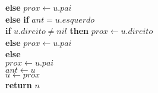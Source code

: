 \documentclass{beamer}
\begin{document}
\begin{frame}[shrink]
\begin{oframed}
\begin{flushleft}
\hspace*{1em} \hspace*{1em} \hspace*{1em} \hspace*{1em} {\color{black} \textbf{else}}  \ensuremath{\ensuremath{\mathit{prox}} \gets  \ensuremath{\ensuremath{\mathit{u}}.pai}}\\
\hspace*{1em} \hspace*{1em} \hspace*{1em} {\color{black} \textbf{else}} {\color{black} \textbf{if}} \ensuremath{\ensuremath{\mathit{ant}} = \ensuremath{\mathit{u}}.\ensuremath{\mathit{esquerdo}}}\\
\hspace*{1em} \hspace*{1em} \hspace*{1em} \hspace*{1em} {\color{black} \textbf{if}} \ensuremath{\ensuremath{\mathit{u}}.\ensuremath{\mathit{direito}} \ne nil} {\color{black} \textbf{then}}  \ensuremath{\ensuremath{\mathit{prox}} \gets  \ensuremath{\ensuremath{\mathit{u}}.direito}}\\
\hspace*{1em} \hspace*{1em} \hspace*{1em} \hspace*{1em} {\color{black} \textbf{else}}  \ensuremath{\ensuremath{\mathit{prox}} \gets  \ensuremath{\ensuremath{\mathit{u}}.pai}}\\
\hspace*{1em} \hspace*{1em} \hspace*{1em} {\color{black} \textbf{else}} \\
\hspace*{1em} \hspace*{1em} \hspace*{1em} \hspace*{1em} \ensuremath{\ensuremath{\mathit{prox}} \gets  \ensuremath{\ensuremath{\mathit{u}}.pai}}\\
\hspace*{1em} \hspace*{1em} \hspace*{1em} \ensuremath{\ensuremath{\mathit{ant}} \gets  \ensuremath{u}}\\
\hspace*{1em} \hspace*{1em} \hspace*{1em} \ensuremath{\ensuremath{\mathit{u}} \gets  \ensuremath{prox}}\\
\hspace*{1em} \hspace*{1em} {\color{black} \textbf{return}} \ensuremath{n} \\
\end{flushleft}
\end{oframed}
\end{frame}
\end{document}

